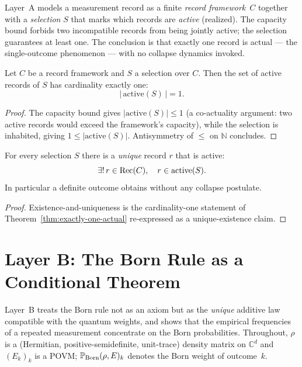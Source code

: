 Layer~A models a measurement record as a finite \emph{record framework}~$C$ together
with a \emph{selection} $S$ that marks which records are \emph{active} (realized).
The capacity bound forbids two incompatible records from being jointly active; the
selection guarantees at least one. The conclusion is that exactly one record is
actual --- the single-outcome phenomenon --- with no collapse dynamics invoked.

\begin{theorem}
  \label{thm:exactly-one-actual}
  \leanok
  Let $C$ be a record framework and $S$ a selection over $C$. Then the set of active
  records of $S$ has cardinality exactly one:
  \[
    \bigl|\, \mathrm{active}(S) \,\bigr| = 1 .
  \]
\end{theorem}

\begin{proof}
  \leanok
  The capacity bound gives $|\mathrm{active}(S)| \le 1$ (a co-actuality argument:
  two active records would exceed the framework's capacity), while the selection is
  inhabited, giving $1 \le |\mathrm{active}(S)|$. Antisymmetry of $\le$ on
  $\mathbb{N}$ concludes.
\end{proof}

\begin{corollary}
  \label{thm:single-outcome}
  \leanok
  For every selection $S$ there is a \emph{unique} record $r$ that is active:
  \[
    \exists!\, r \in \mathrm{Rec}(C), \quad r \in \mathrm{active}(S).
  \]
  In particular a definite outcome obtains without any collapse postulate.
\end{corollary}

\begin{proof}
  \leanok
  Existence-and-uniqueness is the cardinality-one statement of
  Theorem~\ref{thm:exactly-one-actual} re-expressed as a unique-existence claim.
\end{proof}


\chapter{Layer B: The Born Rule as a Conditional Theorem}
\label{chap:layerB}

Layer~B treats the Born rule not as an axiom but as the \emph{unique} additive law
compatible with the quantum weights, and shows that the empirical frequencies of a
repeated measurement concentrate on the Born probabilities. Throughout, $\rho$ is a
(Hermitian, positive-semidefinite, unit-trace) density matrix on $\mathbb{C}^d$ and
$(E_k)_{k}$ is a POVM; $\mathbb{P}_{\mathrm{Born}}(\rho,E)_k$ denotes the Born weight of outcome~$k$.

